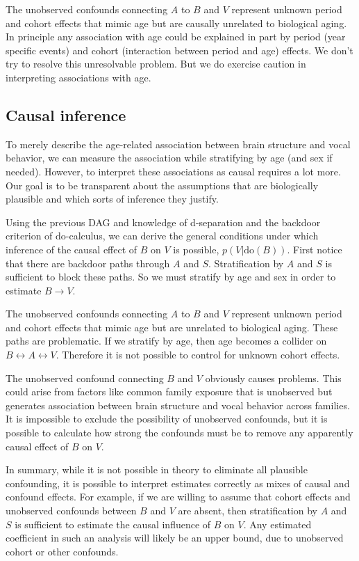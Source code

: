 \documentclass[reqno ,11pt]{amsart}
\begin{document}
The unobserved confounds connecting $A$ to $B$ and $V$ represent unknown period and cohort effects that mimic age but are causally unrelated to biological aging. In principle any association with age could be explained in part by period (year specific events) and cohort (interaction between period and age) effects. We don't try to resolve this unresolvable problem. But we do exercise caution in interpreting associations with age.


\subsection{Causal inference}

To merely describe the age-related association between brain structure and vocal behavior, we can measure the association while stratifying by age (and sex if needed). However, to interpret these associations as causal requires a lot more. Our goal is to be transparent about the assumptions that are biologically plausible and which sorts of inference they justify.

Using the previous DAG and knowledge of d-separation and the backdoor criterion of do-calculus, we can derive the general conditions under which inference of the causal effect of $B$ on $V$ is possible, $p(V|\mathrm{do}(B))$.
First notice that there are backdoor paths through $A$ and $S$. Stratification by $A$ and $S$ is sufficient to block these paths. So we must stratify by age and sex in order to estimate $B \rightarrow V$. 

The unobserved confounds connecting $A$ to $B$ and $V$ represent unknown period and cohort effects that mimic age but are unrelated to biological aging. These paths are problematic. If we stratify by age, then age becomes a collider on $B \longleftrightarrow A \longleftrightarrow V$. Therefore it is not possible to control for unknown cohort effects.

The unobserved confound connecting $B$ and $V$ obviously causes problems. This could arise from factors like common family exposure that is unobserved but generates association between brain structure and vocal behavior across families. It is impossible to exclude the possibility of unobserved confounds, but it is possible to calculate how strong the confounds must be to remove any apparently causal effect of $B$ on $V$.

In summary, while it is not possible in theory to eliminate all plausible confounding, it is possible to interpret estimates correctly as mixes of causal and confound effects. For example, if we are willing to assume that cohort effects and unobserved confounds between $B$ and $V$ are absent, then stratification by $A$ and $S$ is sufficient to estimate the causal influence of $B$ on $V$. Any estimated coefficient in such an analysis will likely be an upper bound, due to unobserved cohort or other confounds.
\end{document}
